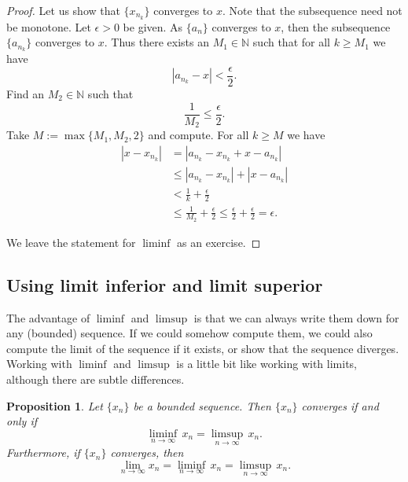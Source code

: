 \documentclass[12pt]{book}
\newcommand{\abs}[1]{\left\lvert {#1} \right\rvert}
\newcommand{\N}{{\mathbb{N}}}
\theoremstyle{plain}
\newtheorem{prop}[thm]{Proposition}
\theoremstyle{remark}
\theoremstyle{definition}
\theoremstyle{exercise}
\theoremstyle{example}
\begin{document}
\begin{proof}
Let us show that $\{ x_{n_k} \}$ converges to $x$.
Note that the subsequence need not be monotone.  Let $\epsilon > 0$ be given.
As $\{ a_n \}$ converges to $x$, then the subsequence
$\{ a_{n_k} \}$ converges to $x$.
Thus there exists an $M_1 \in \N$
such that for all $k \geq M_1$ we have
\begin{equation*}
\abs{a_{n_k} - x} < \frac{\epsilon}{2} .
\end{equation*}
Find an $M_2 \in \N$ such that
\begin{equation*}
\frac{1}{M_2} \leq \frac{\epsilon}{2}.
\end{equation*}
Take $M := \max \{M_1 , M_2 , 2 \}$ and compute.  For all $k \geq M$
we have
\begin{equation*}
\begin{split}
\abs{x- x_{n_k}} & =
\abs{a_{n_k} - x_{n_k} + x - a_{n_k}}
\\
& \leq \abs{a_{n_k} - x_{n_k}} + \abs{x - a_{n_k}}
\\
& < \frac{1}{k} + \frac{\epsilon}{2}
\\
& \leq \frac{1}{M_2} + \frac{\epsilon}{2} \leq \frac{\epsilon}{2} +
\frac{\epsilon}{2} = \epsilon .
\end{split}
\end{equation*}

We leave the statement for $\liminf$ as an exercise.
\end{proof}

\subsection{Using limit inferior and limit superior}

The advantage of $\liminf$ and $\limsup$ is that we can always write them
down for any (bounded) sequence.
If we could somehow compute them, we could also compute the limit of the
sequence if it exists, or show that the sequence diverges.
Working with $\liminf$ and $\limsup$ is a
little bit like working with limits, although there are subtle differences.

\begin{prop} \label{liminfsupconv:prop}
Let $\{ x_n \}$ be a bounded sequence.  Then $\{ x_n \}$ converges
if and only if
\begin{equation*}
\liminf_{n\to \infty} \, x_n = 
\limsup_{n\to \infty} \, x_n.
\end{equation*}
Furthermore, if $\{ x_n \}$ converges, then
\begin{equation*}
\lim_{n\to \infty} x_n = 
\liminf_{n\to \infty} \, x_n = 
\limsup_{n\to \infty} \, x_n.
\end{equation*}
\end{prop}
\end{document}
